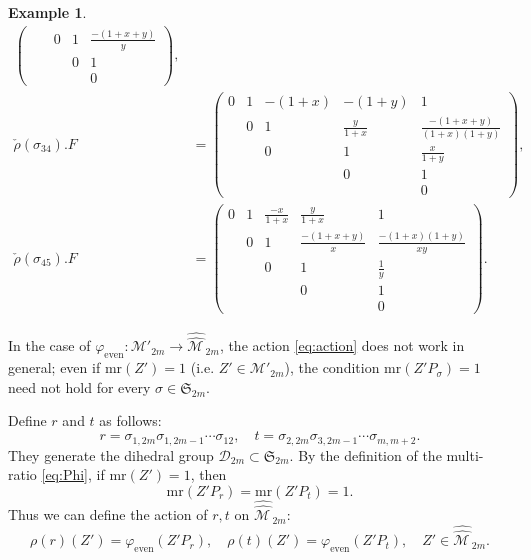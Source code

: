 \documentclass[11pt]{amsart}
\theoremstyle{plain}
\theoremstyle{definition}
\newtheorem{example}[proposition]{Example}
\theoremstyle{remark}
\begin{document}
\begin{example}
\begin{align*}
\begin{pmatrix}
            && 0 & 1 & \frac{-(1+x+y)}{y} \\
            &&& 0 & 1 \\
            &&&& 0
        \end{pmatrix}, \\
    \check{\rho}(\sigma_{34}).F &= \begin{pmatrix}
            0 & 1 & -(1+x) & -(1+y) & 1 \\
            & 0 & 1 & \frac{y}{1+x} & \frac{-(1+x+y)}{(1+x)(1+y)} \\
            && 0 & 1 & \frac{x}{1+y} \\
            &&& 0 & 1 \\
            &&&& 0
        \end{pmatrix}, \\
    \check{\rho}(\sigma_{45}).F &= \begin{pmatrix}
            0 & 1 & \frac{-x}{1+x} & \frac{y}{1+x} & 1 \\
            & 0 & 1 & \frac{-(1+x+y)}{x} & \frac{-(1+x)(1+y)}{xy} \\
            && 0 & 1 & \frac{1}{y} \\
            &&& 0 & 1 \\
            &&&& 0
        \end{pmatrix}.
\end{align*}
\end{example}

In the case of $\varphi_{\text{even}}: \mathcal{M}'_{2m} \rightarrow \widehat{\widehat{\mathcal{M}\,}}_{2m}$, the action \eqref{eq:action} does not work in
general;
even if $\mathrm{mr}(Z')=1$ (i.e. $Z'\in\mathcal{M}'_{2m}$), the condition $\mathrm{mr}(Z'P_{\sigma})=1$ need not hold
for every $\sigma\in \mathfrak{S}_{2m}$.

Define $r$ and $t$ as follows:
\begin{equation}
r=\sigma_{1,2m}\sigma_{1,2m-1}\cdots\sigma_{12}, \quad t=\sigma_{2,2m}\sigma_{3,2m-1}\cdots\sigma_{m,m+2}.
\end{equation}
They generate the dihedral group $\mathcal{D}_{2m} \subset \mathfrak{S}_{2m}$.
By the definition of the multi-ratio \eqref{eq:Phi}, if $\mathrm{mr}(Z')=1$, then
\begin{equation}
    \mathrm{mr}(Z'P_{r})=\mathrm{mr}(Z'P_{t})=1.
\end{equation}
Thus we can define the action of $r, t$ on $\widehat{\widehat{\mathcal{M}\,}}_{2m}$:
\begin{equation}
    \rho(r)(Z') = \varphi_{\text{even}}(Z' P_{r}), \quad
    \rho(t)(Z') = \varphi_{\text{even}}(Z' P_{t}), \quad
    Z'\in \widehat{\widehat{\mathcal{M}\,}}_{2m}. \label{eq:dihedral}
\end{equation}
\end{document}
